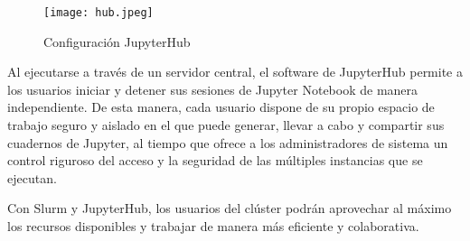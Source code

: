 \begin{spacing}{1.5}
  \begin{figure}[h]
      \centering
      \texttt{[image: hub.jpeg]}
      \caption{Configuración JupyterHub}
      \label{fig:etiqueta}
    \end{figure}

    Al ejecutarse a través de un servidor central, el software de JupyterHub permite a los usuarios iniciar y detener sus sesiones de Jupyter Notebook de manera independiente. De esta manera, cada usuario dispone de su propio espacio de trabajo seguro y aislado en el que puede generar, llevar a cabo y compartir sus cuadernos de Jupyter, al tiempo que ofrece a los administradores de sistema un control riguroso del acceso y la seguridad de las múltiples instancias que se ejecutan.

    Con Slurm y JupyterHub, los usuarios del clúster podrán aprovechar al máximo los recursos disponibles y trabajar de manera más eficiente y colaborativa.

  \mylinespacing
  \mylinespacing
  \begin{tightcenter}
  \end{tightcenter}
\end{spacing}